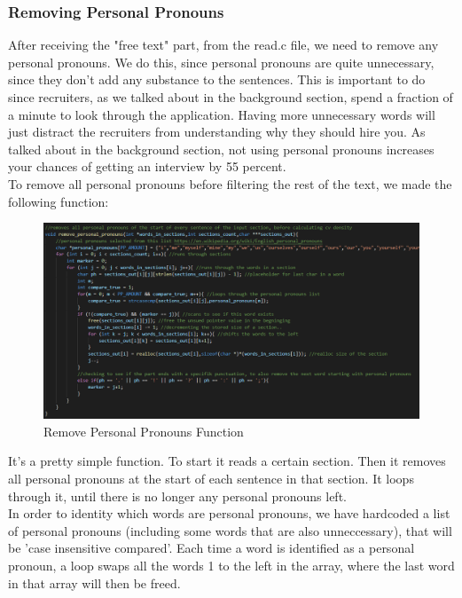 \subsubsection{Removing Personal Pronouns}
After receiving the "free text" part, from the read.c file, we need to remove any personal pronouns.
We do this, since personal pronouns are quite unnecessary, since they don't add any substance to the sentences.
This is important to do since recruiters, as we talked about in the background section, spend a fraction of a minute
to look through the application. 
Having more unnecessary words will just distract the recruiters from understanding why they should hire you.
As talked about in the background section, not using personal pronouns increases your
chances of getting an interview by 55 percent.
\\
To remove all personal pronouns before filtering the rest of the text, we made the following function:
\begin{figure}[H]
  \centering
  \includegraphics[scale = 0.6]{figures/personal_pronoun.png}
  \caption{Remove Personal Pronouns Function}\label{fig:ie}
\end{figure}
It's a pretty simple function. To start it reads a certain section. Then it removes all personal pronouns at the start of each sentence in that section.
It loops through it, until there is no longer any personal pronouns left.
\\
In order to identity which words are personal pronouns, we have hardcoded a list of personal pronouns\cite{english_personal_pronouns} (including some words that are also unneccessary), that will be 'case insensitive compared'.
Each time a word is identified as a personal pronoun, a loop swaps all the words 1 to the left in the array, where the last word in that array will then be freed.
